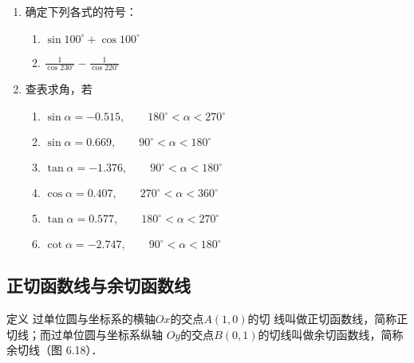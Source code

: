 \begin{enumerate}
\item 确定下列各式的符号：
\begin{multicols}{2}
\begin{enumerate}
    \item $\sin 100^{\circ}+\cos100^{\circ}$
    \item $\frac{1}{\cos230^{\circ}}-\frac{1}{\cos220^{\circ}}$
\end{enumerate}
\end{multicols}

\item 查表求角，若
\begin{enumerate}
    \item $\sin\alpha=-0.515,\qquad 180^{\circ}<\alpha<270^{\circ}$
    \item $\sin\alpha=0.669,\qquad 90^{\circ}<\alpha<180^{\circ}$
    \item  $\tan\alpha=-1.376,\qquad 90^{\circ}<\alpha<180^{\circ}$
    \item $\cos\alpha=0.407,\qquad 270^{\circ}<\alpha<360^{\circ}$
    \item $\tan\alpha=0.577,\qquad 180^{\circ}<\alpha<270^{\circ}$
    \item $\cot\alpha=-2.747,\qquad 90^{\circ}<\alpha<180^{\circ}$
\end{enumerate}
\end{enumerate}

\subsection{正切函数线与余切函数线}
\begin{blk}{定义}
    过单位圆与坐标系的横轴$Ox$的交点$A(1,0)$的切
线叫做正切函数线，简称正切线；而过单位圆与坐标系纵轴
$Oy$的交点$B(0,1)$的切线叫做余切函数线，简称余切线（图
6.18）．
\end{blk}

\begin{figure}[htp]
    \centering
{}
    \caption{}
\end{figure}


